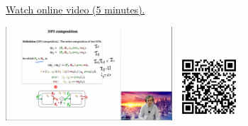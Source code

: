 
\begin{minipage}{10cm}
    \href{https://act4e-spring21.netlify.app/spring2021-design:design:dpi-semicat.html}{Watch online video (5 minutes).}
        
    \href{https://act4e-spring21.netlify.app/spring2021-design:design:dpi-semicat.html}{\includegraphics[height=3.5cm]{spring2021-design:design:dpi-semicat/thumbnails.jpg}}
    \href{https://act4e-spring21.netlify.app/spring2021-design:design:dpi-semicat.html}{\includegraphics[height=2.5cm]{spring2021-design:design:dpi-semicat/qrcode.png}}
\end{minipage}
